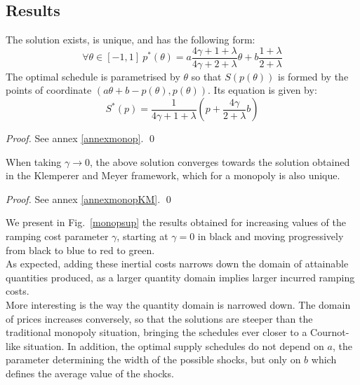 \subsection{Results}
\begin{proposition}\label{monopequilibria}
The solution exists, is unique, and has the following form:
\begin{equation}
\forall \theta \in [-1,1]~p^*(\theta)=a\frac{4\gamma+1+\lambda}{4\gamma+2+\lambda}\theta+ b\frac{1+\lambda}{2+\lambda} \label{monopsol}
\end{equation}
The optimal schedule is parametrised by $\theta$ so that $S(p(\theta))$ is formed by the points of coordinate $(a\theta+b-p(\theta),p(\theta))$. Its equation is given by:
\begin{equation}
S^*(p)=\frac{1}{4\gamma+1+\lambda}\left(p+\frac{4\gamma}{2+\lambda}b\right) \label{monopS}
\end{equation}
\end{proposition}

\begin{proof}
See annex \ref{annexmonop}. \qed
\end{proof} 

\begin{proposition}\label{monopequilibriaKM}
When taking $\gamma\to 0$, the above solution converges towards the solution obtained in the Klemperer and Meyer framework, which for a monopoly is also unique.
\end{proposition}

\begin{proof}
See annex \ref{annexmonopKM}. \qed
\end{proof} 

We present in Fig.~\ref{monopsup} the results obtained for increasing values of the ramping cost parameter $\gamma$, starting at $\gamma=0$ in black and moving progressively from black to blue to red to green. \\

As expected, adding these inertial costs narrows down the domain of attainable quantities produced, as a larger quantity domain implies larger incurred ramping costs.\\

More interesting is the way the quantity domain is narrowed down. The domain of prices increases conversely, so that the solutions are steeper than the traditional monopoly situation, bringing the schedules ever closer to a Cournot-like situation. In addition, the optimal supply schedules do not depend on $a$, the parameter determining the width of the possible shocks, but only on $b$ which defines the average value of the shocks. \\


